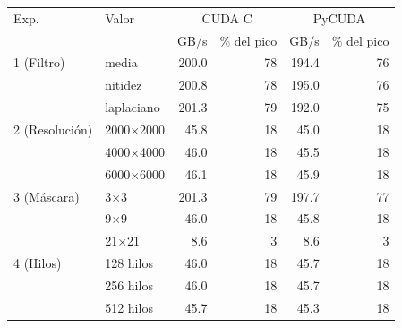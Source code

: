 \begin{tabular}{llrrrr}
\toprule
Exp. & Valor & \multicolumn{2}{c}{CUDA C} & \multicolumn{2}{c}{PyCUDA} \\
 & & GB/s & \% del pico & GB/s & \% del pico \\
\midrule
1 (Filtro) & media & 200.0 & 78 & 194.4 & 76 \\
 & nitidez & 200.8 & 78 & 195.0 & 76 \\
 & laplaciano & 201.3 & 79 & 192.0 & 75 \\
\midrule
2 (Resolución) & 2000$\times$2000 & 45.8 & 18 & 45.0 & 18 \\
 & 4000$\times$4000 & 46.0 & 18 & 45.5 & 18 \\
 & 6000$\times$6000 & 46.1 & 18 & 45.9 & 18 \\
\midrule
3 (Máscara) & 3$\times$3 & 201.3 & 79 & 197.7 & 77 \\
 & 9$\times$9 & 46.0 & 18 & 45.8 & 18 \\
 & 21$\times$21 & 8.6 & 3 & 8.6 & 3 \\
\midrule
4 (Hilos) & 128 hilos & 46.0 & 18 & 45.7 & 18 \\
 & 256 hilos & 46.0 & 18 & 45.7 & 18 \\
 & 512 hilos & 45.7 & 18 & 45.3 & 18 \\
\bottomrule
\end{tabular}
